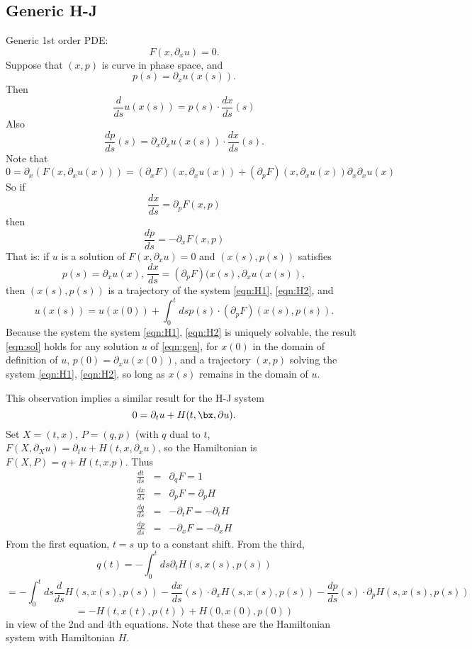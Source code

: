 \subsection{Generic H-J}
Generic 1st order PDE:
\begin{equation}
  \label{eqn:gen}
  F(x, \partial_x u) = 0.
\end{equation}
Suppose that $(x,p)$
is curve in phase space, and
\begin{equation}
  \label{eqn:defp}
  p(s) = \partial_x u(x(s)).
\end{equation}
Then
\[
  \frac{d}{ds}u(x(s))=p(s) \cdot \frac{dx}{ds}(s)
\]
Also
\[
  \frac{dp}{ds}(s) = \partial_x \partial_x u(x(s))\cdot
  \frac{dx}{ds}(s).
\]
Note that
\[
  0 = \partial_x( F(x, \partial_x u(x))) = (\partial_x F)(x,
  \partial_x u(x)) + 
  (\partial_p F)(x, \partial_x u(x)) \partial_x \partial_x u(x)
\]
So if
\begin{equation}
  \label{eqn:H1}
  \frac{dx}{ds} = \partial_p F(x,p)
\end{equation}
then
\begin{equation}
  \label{eqn:H2}
  \frac{dp}{ds} = -\partial_x F(x,p)
\end{equation}
That is: if $u$ is a solution of $F(x,\partial_x u)=0$ and
$(x(s),p(s))$ satisfies
\[
  p(s)=\partial_x u(x),\, \frac{dx}{ds} = (\partial_p
  F)(x(s),\partial_x u(x(s)),
\]
then $(x(s),p(s))$ is a trajectory of the system \ref{eqn:H1},
\ref{eqn:H2}, and
\begin{equation}
  \label{eqn:sol}
  u(x(s))=u(x(0)) + \int_0^t ds p(s)\cdot (\partial_p F)(x(s),p(s)).
\end{equation}
Because the system the system \ref{eqn:H1},
\ref{eqn:H2} is uniquely solvable, the result \ref{eqn:sol} holds for
any solution $u$ of \ref{eqn:gen}, for $x(0)$ in the domain of
definition of $u$, $p(0)=\partial_xu(x(0))$, and a trajectory $(x,p)$
solving the system \ref{eqn:H1}, \ref{eqn:H2}, so long as $x(s)$
remains in the domain of $u$.

This observation implies a similar result for the H-J system
\begin{equation}
  \label{eqn:hjdef}
  0 = \partial_t u + H(t,\bx,\partial u).
\end{equation}
Set $X=(t,x)$, $P=(q,p)$ (with $q$ dual to $t$, $F(X,\partial_X u) =
\partial_t u + H(t,x,\partial_x u)$, so the Hamiltonian is $F(X,P) =
q+H(t,x.p)$.  Thus
\begin{eqnarray*}
  \frac{dt}{ds} & = & \partial_q F = 1 \\
  \frac{dx}{ds} & = & \partial_p F = \partial_p H \\
  \frac{dq}{ds} & = & -\partial_t F = -\partial_t H \\
  \frac{dp}{ds} & = & -\partial_x F = -\partial_x H
\end{eqnarray*}
From the first equation, $t=s$ up to a constant shift. From the third,
\[
  q(t) = -\int_0^t ds \partial_tH(s,x(s),p(s))
\]
\[
  = -\int_0^t ds \frac{d}{ds}H(s,x(s),p(s)) - \frac{dx}{ds}(s)\cdot
  \partial_x H(s,x(s),p(s)) -\frac{dp}{ds}(s)\cdot \partial_p
  H(s,x(s),p(s))
\]
\[
  = -H(t,x(t),p(t)) + H(0,x(0),p(0))
\]
in view of the 2nd and 4th equations.
Note that these are the Hamiltonian system with Hamiltonian $H$.

